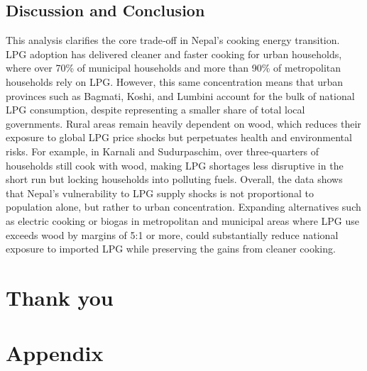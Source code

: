 \documentclass[
  letterpaper,
  DIV=11,
  numbers=noendperiod]{scrartcl}
\begin{document}
\subsection{Discussion and Conclusion}\label{discussion-and-conclusion}

This analysis clarifies the core trade‑off in Nepal's cooking energy
transition. LPG adoption has delivered cleaner and faster cooking for
urban households, where over 70\% of municipal households and more than
90\% of metropolitan households rely on LPG. However, this same
concentration means that urban provinces such as Bagmati, Koshi, and
Lumbini account for the bulk of national LPG consumption, despite
representing a smaller share of total local governments. Rural areas
remain heavily dependent on wood, which reduces their exposure to global
LPG price shocks but perpetuates health and environmental risks. For
example, in Karnali and Sudurpaschim, over three‑quarters of households
still cook with wood, making LPG shortages less disruptive in the short
run but locking households into polluting fuels. Overall, the data shows
that Nepal's vulnerability to LPG supply shocks is not proportional to
population alone, but rather to urban concentration. Expanding
alternatives such as electric cooking or biogas in metropolitan and
municipal areas where LPG use exceeds wood by margins of 5:1 or more,
could substantially reduce national exposure to imported LPG while
preserving the gains from cleaner cooking.

\section{Thank you}\label{thank-you}

\section{Appendix}\label{appendix}
\end{document}
